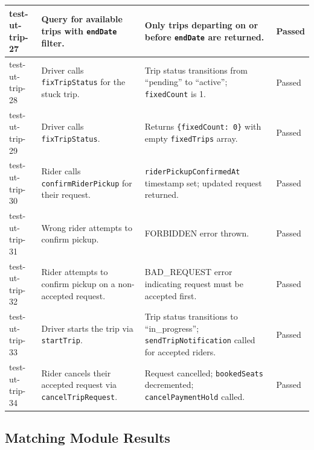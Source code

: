 \begin{longtable}{|p{}|>{\raggedright\arraybackslash}p{}|>{\raggedright\arraybackslash}p{}|p{}|}
\hline
test-ut-trip-27 & Query for available trips with \texttt{endDate} filter. & Only trips departing on or before \texttt{endDate} are returned. & Passed \\
\hline
test-ut-trip-28 & Driver calls \texttt{fixTripStatus} for the stuck trip. & Trip status transitions from ``pending'' to ``active''; \texttt{fixedCount} is 1. & Passed \\
\hline
test-ut-trip-29 & Driver calls \texttt{fixTripStatus}. & Returns \texttt{\{fixedCount: 0\}} with empty \texttt{fixedTrips} array. & Passed \\
\hline
test-ut-trip-30 & Rider calls \texttt{confirmRiderPickup} for their request. & \texttt{riderPickupConfirmedAt} timestamp set; updated request returned. & Passed \\
\hline
test-ut-trip-31 & Wrong rider attempts to confirm pickup. & FORBIDDEN error thrown. & Passed \\
\hline
test-ut-trip-32 & Rider attempts to confirm pickup on a non-accepted request. & BAD\_REQUEST error indicating request must be accepted first. & Passed \\
\hline
test-ut-trip-33 & Driver starts the trip via \texttt{startTrip}. & Trip status transitions to ``in\_progress''; \texttt{sendTripNotification} called for accepted riders. & Passed \\
\hline
test-ut-trip-34 & Rider cancels their accepted request via \texttt{cancelTripRequest}. & Request cancelled; \texttt{bookedSeats} decremented; \texttt{cancelPaymentHold} called. & Passed \\
\hline
\end{longtable}

\subsection{Matching Module Results}

